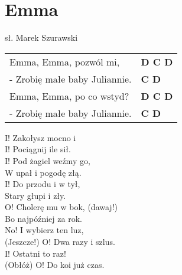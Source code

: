 \section{Emma}

sł. Marek Szurawski

\vspace{2em}
\begin{tabular}{@{}p{7cm}@{}l@{}}
Emma, Emma, pozwól mi, & \bfseries D C D\\
- Zrobię małe baby Juliannie. & \bfseries C D\\
Emma, Emma, po co wstyd? & \bfseries D C D\\
- Zrobię małe baby Juliannie. & \bfseries C D\\
\end{tabular}

\vspace{1em}
I! Zakołysz mocno i \\
I! Pociągnij ile sił. \\

I! Pod żagiel weźmy go, \\
W upał i pogodę złą. \\

I! Do przodu i w tył, \\
Stary głupi i zły. \\

O! Cholerę mu w bok, (dawaj!) \\
Bo najpóźniej za rok. \\

No! I wybierz ten luz, \\
(Jeszcze!) O! Dwa razy i szlus. \\

I! Ostatni to raz! \\
(Obłóż) O! Do koi już czas. \\
